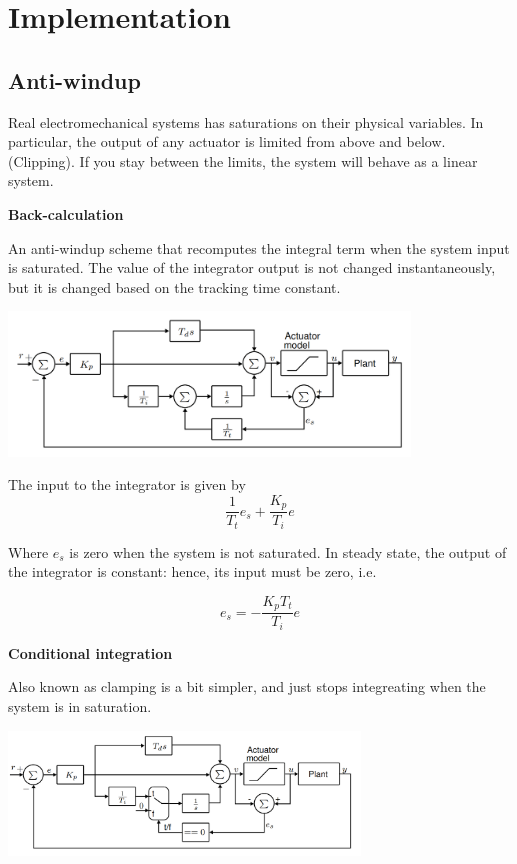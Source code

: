 \section{Implementation}

\subsection{Anti-windup}

Real electromechanical systems has saturations on their physical variables. In particular,
the output of any actuator is limited from above and below. (Clipping).
If you stay between the limits, the system will behave as a linear system.

\textbf{Back-calculation}

An anti-windup scheme that recomputes the integral term when the system
input is saturated. The value of the integrator output is not changed instantaneously, but it is changed
based on the tracking time constant.

\begin{center}
	\includegraphics[width = 0.8\textwidth]{Images/backCalc.png}
\end{center}

The input to the integrator is given by
$$ \frac{1}{T_t}e_s  + \frac{K_p}{T_i}e $$

Where $e_s$ is zero when the system is not saturated. In steady state, the output of the integrator is constant:
hence, its input must be zero, i.e.

$$ e_s = -\frac{K_p T_t}{T_i}e $$


\textbf{Conditional integration}

Also known as clamping is a bit simpler, and just stops integreating when the system is in saturation.
\begin{center}
	\includegraphics[width=0.7\textwidth]{Images/conditional-integration.png}
\end{center}


